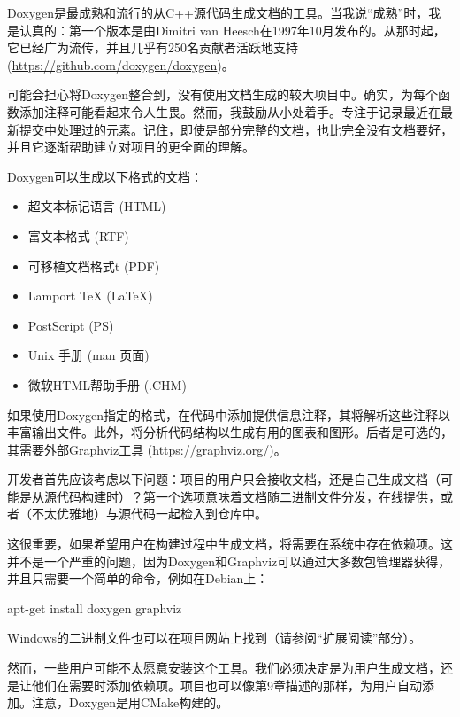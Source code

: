 Doxygen是最成熟和流行的从C++源代码生成文档的工具。当我说“成熟”时，我是认真的：第一个版本是由Dimitri van Heesch在1997年10月发布的。从那时起，它已经广为流传，并且几乎有250名贡献者活跃地支持 (\url{https://github.com/doxygen/doxygen})。

可能会担心将Doxygen整合到，没有使用文档生成的较大项目中。确实，为每个函数添加注释可能看起来令人生畏。然而，我鼓励从小处着手。专注于记录最近在最新提交中处理过的元素。记住，即使是部分完整的文档，也比完全没有文档要好，并且它逐渐帮助建立对项目的更全面的理解。

Doxygen可以生成以下格式的文档：

\begin{itemize}
\item
超文本标记语言 (HTML)

\item
富文本格式 (RTF)

\item
可移植文档格式t (PDF)

\item
Lamport TeX (LaTeX)

\item
PostScript (PS)

\item
Unix 手册 (man 页面)

\item
微软HTML帮助手册 (.CHM)
\end{itemize}

如果使用Doxygen指定的格式，在代码中添加提供信息注释，其将解析这些注释以丰富输出文件。此外，将分析代码结构以生成有用的图表和图形。后者是可选的，其需要外部Graphviz工具 (\url{https://graphviz.org/})。

开发者首先应该考虑以下问题：项目的用户只会接收文档，还是自己生成文档（可能是从源代码构建时）？第一个选项意味着文档随二进制文件分发，在线提供，或者（不太优雅地）与源代码一起检入到仓库中。

这很重要，如果希望用户在构建过程中生成文档，将需要在系统中存在依赖项。这并不是一个严重的问题，因为Doxygen和Graphviz可以通过大多数包管理器获得，并且只需要一个简单的命令，例如在Debian上：

\begin{shell}
apt-get install doxygen graphviz
\end{shell}

Windows的二进制文件也可以在项目网站上找到（请参阅“扩展阅读”部分）。

然而，一些用户可能不太愿意安装这个工具。我们必须决定是为用户生成文档，还是让他们在需要时添加依赖项。项目也可以像第9章描述的那样，为用户自动添加。注意，Doxygen是用CMake构建的。

